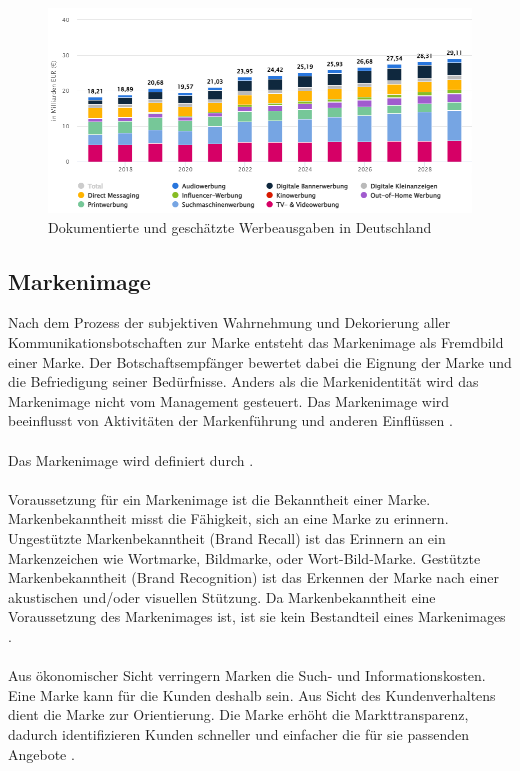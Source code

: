 \begin{figure}[H]
    \centering
    \includegraphics[width=0.90\linewidth]{images/werbede.png}
    \caption{Dokumentierte und geschätzte Werbeausgaben in Deutschland \cite{statista_werbung}}
    \label{fig:statistawerbungde}
\end{figure}
\subsection{Markenimage}
\label{markenimage}
Nach dem Prozess der subjektiven Wahrnehmung und Dekorierung aller Kommunikationsbotschaften zur Marke entsteht das Markenimage als Fremdbild einer Marke. Der Botschaftsempfänger bewertet dabei die Eignung der Marke und die Befriedigung seiner Bedürfnisse. Anders als die Markenidentität wird das Markenimage nicht vom Management gesteuert. Das Markenimage wird beeinflusst von Aktivitäten der Markenführung und anderen Einflüssen \cite{burmann2024}. \\\\
Das Markenimage wird definiert durch   \cite{burmann2024}.\\\\
Voraussetzung für ein Markenimage ist die Bekanntheit einer Marke. Markenbekanntheit misst die Fähigkeit, sich an eine Marke zu erinnern. Ungestützte Markenbekanntheit (Brand Recall) ist das Erinnern an ein Markenzeichen wie Wortmarke, Bildmarke, oder Wort-Bild-Marke. Gestützte Markenbekanntheit (Brand Recognition) ist das Erkennen der Marke nach einer akustischen und/oder visuellen Stützung. Da Markenbekanntheit eine Voraussetzung des Markenimages ist, ist sie kein Bestandteil eines Markenimages \cite{burmann2024}. \\\\
Aus ökonomischer Sicht verringern Marken die Such- und Informationskosten. Eine Marke kann für die Kunden deshalb  sein. Aus Sicht des Kundenverhaltens dient die Marke zur Orientierung. Die Marke erhöht die Markttransparenz, dadurch identifizieren Kunden schneller und einfacher die für sie passenden Angebote \cite{burmann2024}.  
